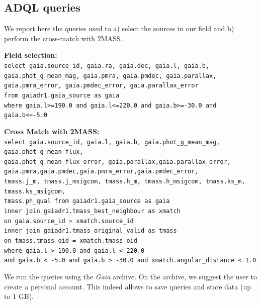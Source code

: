 \documentclass[twocolumn]{aa}
\begin{document}
\begin{appendix}
\onecolumn
\section{ADQL queries}\label{App:ADQL}
We report here the queries used to a) select the sources in our field and b) perform the cross-match with 2MASS. \\
\noindent

\vspace{0.5cm}
\noindent
\textbf{Field selection: \\} 
\noindent
\texttt{select gaia.source\_id, gaia.ra, gaia.dec, gaia.l, gaia.b, gaia.phot\_g\_mean\_mag, gaia.pmra, gaia.pmdec, gaia.parallax, 
gaia.pmra\_error, gaia.pmdec\_error, gaia.parallax\_error  \\
from gaiadr1.gaia\_source as gaia \\
where gaia.l>=190.0 and gaia.l<=220.0 and gaia.b>=-30.0 and gaia.b<=-5.0}

\vspace{0.5cm}
\noindent
\textbf{Cross Match with 2MASS: \\} 
\noindent
\texttt{select gaia.source\_id, gaia.l, gaia.b, gaia.phot\_g\_mean\_mag, 
gaia.phot\_g\_mean\_flux, \\ gaia.phot\_g\_mean\_flux\_error,
gaia.parallax,gaia.parallax\_error, \\gaia.pmra,gaia.pmdec,gaia.pmra\_error,gaia.pmdec\_error, \\
 tmass.j\_m, tmass.j\_msigcom, tmass.h\_m, tmass.h\_msigcom, tmass.ks\_m,  tmass.ks\_msigcom,  \\ tmass.ph\_qual
from gaiadr1.gaia\_source as gaia \\
inner join gaiadr1.tmass\_best\_neighbour as xmatch \\
on gaia.source\_id = xmatch.source\_id \\
inner join gaiadr1.tmass\_original\_valid as tmass \\
on tmass.tmass\_oid = xmatch.tmass\_oid \\
where gaia.l > 190.0 and gaia.l < 220.0 \\and gaia.b < -5.0 and gaia.b > -30.0 and xmatch.angular\_distance < 1.0}

\vspace{0.5cm}
\noindent
We run the queries using the \textit{Gaia} archive. On the archive, we suggest the user to create a personal account. This indeed allows to save queries and store data (up to 1 GB).

\twocolumn

\end{appendix}
\end{document}
